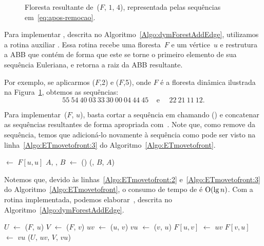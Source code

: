 \begin{figure}[htb]
\centering

\caption{Floresta resultante de~\dymForestDelEdge($F$, $1$, $4$), representada pelas sequências em~\eqref{eq:apos-remocao}.}
\label{fig:algorit-del-pos}
\end{figure}

Para implementar \dymForestAddEdge{}, descrita no Algoritmo~\ref{Algo:dymForestAddEdge}, utilizamos a rotina auxiliar \ETmovetofront{}.
Essa rotina recebe uma floresta~$F$ e um vértice~$u$ e restrutura a ABB que contém  de forma que este se torne o primeiro elemento de sua sequência Euleriana, e retorna a raiz da ABB resultante. 

Por exemplo, se aplicarmos \ETmovetofront($F$,2) e \ETmovetofront($F$,5), onde $F$ é a floresta dinâmica ilustrada na Figura~\ref{fig:algorit-del-pos}, obtemos as sequências:
\begin{equation}
55~54~40~03~33~30~00~04~44~45~~~~~\text{e}~~~~~~22~21~11~12.\label{eq:apos-moveToFront}
\end{equation}

Para implementar~\ETmovetofront($F$, $u$), basta cortar a sequência em  chamando \treapSplit() e concatenar as sequências resultantes de forma apropriada com~\treapJoin{}.
Note que, como \treapSplit{} remove  da sequência, temos que adicioná-lo novamente à sequência como pode ser visto na linha~\ref{Algo:ETmovetofront:3} do Algoritmo~\ref{Algo:ETmovetofront}.

\begin{algorithm}[htb]
\caption{\ETmovetofront($F$, $u$)}
\label{Algo:ETmovetofront}
\begin{algorithmic}[1]
\State {} $\gets$ $F[u,u]$\label{Algo:ETmovetofront:1}
\State $A$, , $B$ $\gets$ \treapSplit()\label{Algo:ETmovetofront:2}
\State \Return \treapJoin(, $B$, $A$)\label{Algo:ETmovetofront:3}
\end{algorithmic}
\end{algorithm}

Notemos que, devido às linhas~\ref{Algo:ETmovetofront:2} e~\ref{Algo:ETmovetofront:3} do Algoritmo~\ref{Algo:ETmovetofront}, o consumo de tempo de \ETmovetofront{} é $\mathrm{O}(\lg n)$.
Com a rotina \ETmovetofront{} implementada, podemos elaborar~\dymForestAddEdge{}, descrita no Algoritmo~\ref{Algo:dymForestAddEdge}.


\begin{algorithm}[htb]
\caption{\dymForestAddEdge($F$, $u$, $v$)}
\label{Algo:dymForestAddEdge}
\begin{algorithmic}[1]
\State $U$ $\gets$ \ETmovetofront($F$, $u$)
\State $V$ $\gets$ \ETmovetofront($F$, $v$)
\State $uv$ $\gets$ \treapCreate($u$, $v$)
\State $vu$ $\gets$ \treapCreate($v$, $u$)
\State $F[u,v]$ $\gets$ $uv$
\State $F[v,u]$ $\gets$ $vu$
\State \treapJoin($U$, $uv$, $V$, $vu$)
\end{algorithmic}
\end{algorithm}


